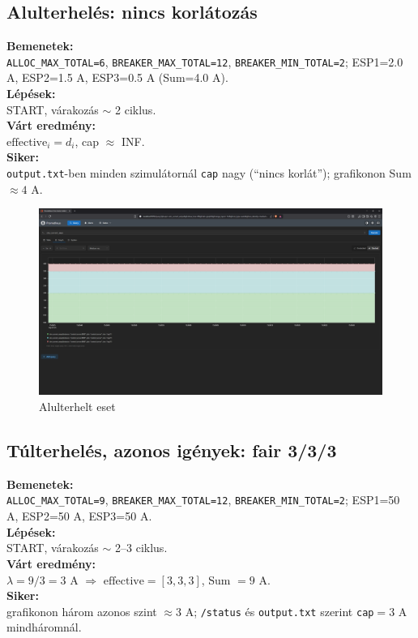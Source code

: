 \subsection{Alulterhelés: nincs korlátozás}
\textbf{Bemenetek:}\\ \texttt{ALLOC\_MAX\_TOTAL=6}, \texttt{BREAKER\_MAX\_TOTAL=12}, 
\texttt{BREAKER\_MIN\_TOTAL=2}; ESP1=2.0 A, ESP2=1.5 A, ESP3=0.5 A (Sum=4.0 A).\\
\textbf{Lépések:}\\ START, várakozás \(\sim\) 2 ciklus.\\
\textbf{Várt eredmény:}\\ \(\mathrm{effective}_i = d_i\), cap \(\approx\) INF.\\
\textbf{Siker:}\\ \texttt{output.txt}-ben minden szimulátornál \texttt{cap} nagy (``nincs korlát''); 
grafikonon Sum \(\approx 4\) A.

\begin{figure}[H]
    \centering
    \includegraphics[width=1\textwidth]{figures/undercap_2.png}
    \caption{Alulterhelt eset}
    \label{fig:undercap}
\end{figure}

\subsection{Túlterhelés, azonos igények: fair 3/3/3}
\textbf{Bemenetek:}\\ \texttt{ALLOC\_MAX\_TOTAL=9}, \texttt{BREAKER\_MAX\_TOTAL=12}, 
\texttt{BREAKER\_MIN\_TOTAL=2}; ESP1=50 A, ESP2=50 A, ESP3=50 A.\\
\textbf{Lépések:}\\ START, várakozás \(\sim\) 2--3 ciklus.\\
\textbf{Várt eredmény:}\\ \(\lambda=9/3=3\) A \(\Rightarrow\) \(\mathrm{effective}=[3,3,3]\), Sum \(=9\) A.\\
\textbf{Siker:}\\ grafikonon három azonos szint \(\approx 3\) A; \texttt{/status} 
és \texttt{output.txt} szerint \texttt{cap}\(=3\) A mindháromnál.

